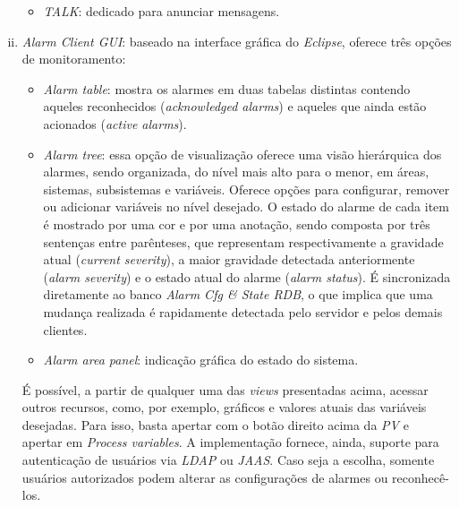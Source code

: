 \begin{enumerate}[i.]
\begin{itemize}
    \item \textit{TALK}: dedicado para anunciar mensagens.
    
  \end{itemize}
  
  \item \textit{Alarm Client GUI}: \label{client-gui} baseado na interface
  gráfica do \textit{Eclipse}, oferece três opções de monitoramento:
  
  \begin{itemize} \renewcommand\labelitemi{--}
    \item \textit{Alarm table}: mostra os alarmes em duas tabelas distintas
    contendo aqueles reconhecidos (\textit{acknowledged alarms}) e aqueles que
    ainda estão acionados (\textit{active alarms}).
    
    \item \textit{Alarm tree}: essa opção de visualização oferece
    uma visão hierárquica dos alarmes, sendo organizada, do nível mais alto para
    o menor, em áreas, sistemas, subsistemas e variáveis. Oferece opções para
    configurar, remover ou adicionar variáveis no nível desejado. O estado do
    alarme de cada item é mostrado por uma cor e por uma anotação, sendo
    composta por três sentenças entre parênteses, que representam
    respectivamente a gravidade atual (\textit{current severity}), a
    maior gravidade detectada anteriormente (\textit{alarm severity}) e o estado
    atual do alarme (\textit{alarm status}). É sincronizada diretamente ao banco
    \textit{Alarm Cfg \& State RDB}, o que implica que uma mudança realizada é
    rapidamente detectada pelo servidor e pelos demais clientes.
    
    \item \textit{Alarm area panel}: indicação gráfica do estado do sistema.
    
  \end{itemize}
  
  É possível, a partir de qualquer uma das \textit{views} presentadas acima,
  acessar outros recursos, como, por exemplo, gráficos e valores atuais das
  variáveis desejadas. Para isso, basta apertar com o botão direito acima da
  \textit{PV} e apertar em \textit{Process variables}. A implementação fornece,
  ainda, suporte para autenticação de usuários via \textit{LDAP} ou
  \textit{JAAS}. Caso seja a escolha, somente usuários autorizados podem alterar
  as configurações de alarmes ou reconhecê-los.
  
\end{enumerate}


